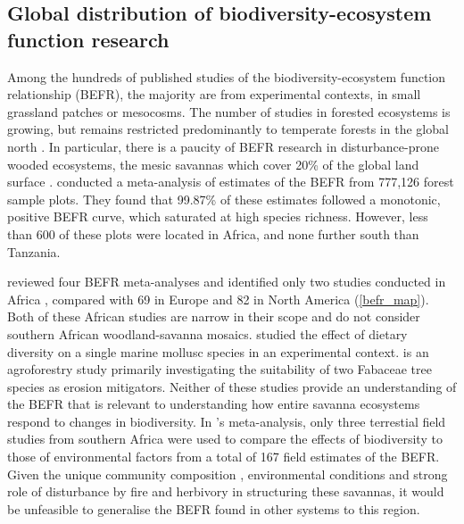 \begin{refsection}
\subsection{Global distribution of biodiversity-ecosystem function research}

Among the hundreds of published studies of the biodiversity-ecosystem function relationship (BEFR), the majority are from experimental contexts, in small grassland patches or mesocosms. The number of studies in forested ecosystems is growing, but remains restricted predominantly to temperate forests in the global north \citep{Clarke2017}. In particular, there is a paucity of BEFR research in disturbance-prone wooded ecosystems, the mesic savannas which cover \textapprox{}20\% of the global land surface \citep{Scholes1993}. \citet{Liang2016} conducted a meta-analysis of estimates of the BEFR from 777,126 forest sample plots. They found that 99.87\% of these estimates followed a monotonic, positive BEFR curve, which saturated at high species richness. However, less than 600 of these plots were located in Africa, and none further south than Tanzania. 

\citet{Clarke2017} reviewed four BEFR meta-analyses \citep{Gamfeldt2015, Griffin2013a, Zhang2012, Cardinale2009} and identified only two studies conducted in Africa \citep{Foster1999, Burleigh1997}, compared with 69 in Europe and 82 in North America (\autoref{befr_map}). Both of these African studies are narrow in their scope and do not consider southern African woodland-savanna mosaics. \citet{Foster1999} studied the effect of dietary diversity on a single marine mollusc species in an experimental context. \citet{Burleigh1997} is an agroforestry study primarily investigating the suitability of two Fabaceae tree species as erosion mitigators. Neither of these studies provide an understanding of the BEFR that is relevant to understanding how entire savanna ecosystems respond to changes in biodiversity. In \citeauthor{Duffy2017}'s \citeyearpar{Duffy2017} meta-analysis, only three terrestial field studies from southern Africa were used to compare the effects of biodiversity to those of environmental factors from a total of 167 field estimates of the BEFR. Given the unique community composition \citep{Lehmann2011}, environmental conditions \citep{Linder2003} and strong role of disturbance by fire and herbivory in structuring these savannas, it would be unfeasible to generalise the BEFR found in other systems to this region.


\end{refsection}
